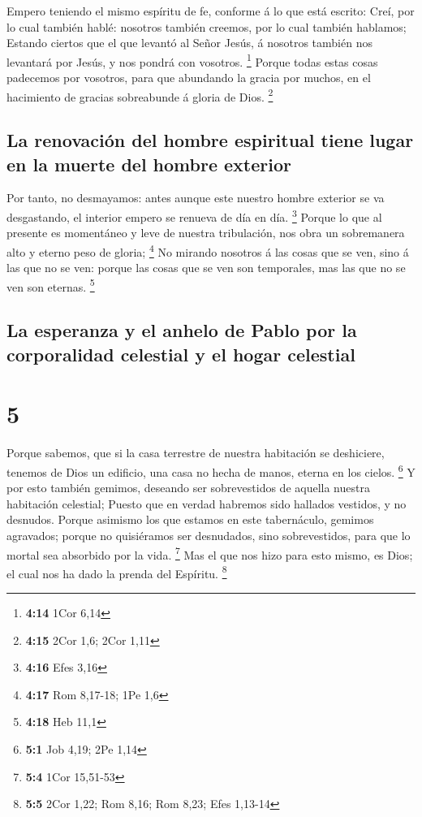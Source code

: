  Empero teniendo el mismo espíritu de fe, conforme á lo
que está escrito: Creí, por lo cual también hablé: nosotros también
creemos, por lo cual también hablamos;  Estando ciertos
que el que levantó al Señor Jesús, á nosotros también nos levantará por
Jesús, y nos pondrá con vosotros. \footnote{\textbf{4:14} 1Cor 6,14}
 Porque todas estas cosas padecemos por vosotros, para
que abundando la gracia por muchos, en el hacimiento de gracias
sobreabunde á gloria de Dios. \footnote{\textbf{4:15} 2Cor 1,6; 2Cor
  1,11}

\hypertarget{la-renovaciuxf3n-del-hombre-espiritual-tiene-lugar-en-la-muerte-del-hombre-exterior}{%
\subsection{La renovación del hombre espiritual tiene lugar en la muerte
del hombre
exterior}\label{la-renovaciuxf3n-del-hombre-espiritual-tiene-lugar-en-la-muerte-del-hombre-exterior}}

 Por tanto, no desmayamos: antes aunque este nuestro
hombre exterior se va desgastando, el interior empero se renueva de día
en día. \footnote{\textbf{4:16} Efes 3,16}  Porque lo que
al presente es momentáneo y leve de nuestra tribulación, nos obra un
sobremanera alto y eterno peso de gloria; \footnote{\textbf{4:17} Rom
  8,17-18; 1Pe 1,6}  No mirando nosotros á las cosas que
se ven, sino á las que no se ven: porque las cosas que se ven son
temporales, mas las que no se ven son eternas. \footnote{\textbf{4:18}
  Heb 11,1}

\hypertarget{la-esperanza-y-el-anhelo-de-pablo-por-la-corporalidad-celestial-y-el-hogar-celestial}{%
\subsection{La esperanza y el anhelo de Pablo por la corporalidad
celestial y el hogar
celestial}\label{la-esperanza-y-el-anhelo-de-pablo-por-la-corporalidad-celestial-y-el-hogar-celestial}}

\hypertarget{section-4}{%
\section{5}\label{section-4}}

 Porque sabemos, que si la casa terrestre de nuestra
habitación se deshiciere, tenemos de Dios un edificio, una casa no hecha
de manos, eterna en los cielos. \footnote{\textbf{5:1} Job 4,19; 2Pe
  1,14}  Y por esto también gemimos, deseando ser
sobrevestidos de aquella nuestra habitación celestial; 
Puesto que en verdad habremos sido hallados vestidos, y no desnudos.
 Porque asimismo los que estamos en este tabernáculo,
gemimos agravados; porque no quisiéramos ser desnudados, sino
sobrevestidos, para que lo mortal sea absorbido por la vida. \footnote{\textbf{5:4}
  1Cor 15,51-53}  Mas el que nos hizo para esto mismo, es
Dios; el cual nos ha dado la prenda del Espíritu. \footnote{\textbf{5:5}
  2Cor 1,22; Rom 8,16; Rom 8,23; Efes 1,13-14}

